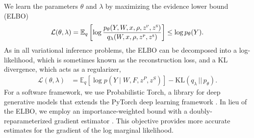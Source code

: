 \documentclass[twoside]{article}
\newcommand{\scp}{\textsc{p}}
\newcommand{\scs}{\textsc{s}}
\begin{document}
We learn the parameters $\theta$ and $\lambda$ by maximizing the evidence lower bound (ELBO)
\begin{align*}
    \mathcal{L}(\theta, \lambda)
    = 
    \mathbb{E}_{q}
    \left[
    \log 
    \frac{p_{\theta}(Y, W, x, \rho, z^\scp, z^\scs)}
         {q_{\lambda}(W, x, \rho, z^\scp, z^\scs)}
    \right]
    \le 
    \log p_\theta(Y).
\end{align*}
As in all variational inference problems, the ELBO can be decomposed into a log-likelihood, which is sometimes known as the reconstruction loss, and a KL divergence, which acts as a regularizer,
\begin{align*}
    \mathcal{L}(\theta, \lambda)
    &= 
    \mathbb{E}_{q}\left[\log p(Y \mid W,F,z^P,z^S)\right] - \text{KL}\left( q_{\lambda} \,\big|\big|\, p_{\theta} \right). %
\end{align*}
For a software framework, we use Probabilistic Torch, a library for deep generative models that extends the PyTorch deep learning framework  \citep{narayanaswamy2017learning}. In lieu of the ELBO, we employ an importance-weighted bound \citep{Burda2016} with a doubly-reparameterized gradient estimator \citep{Tucker2019}. This objective provides more accurate estimates for the gradient of the log marginal likelihood.
\end{document}

